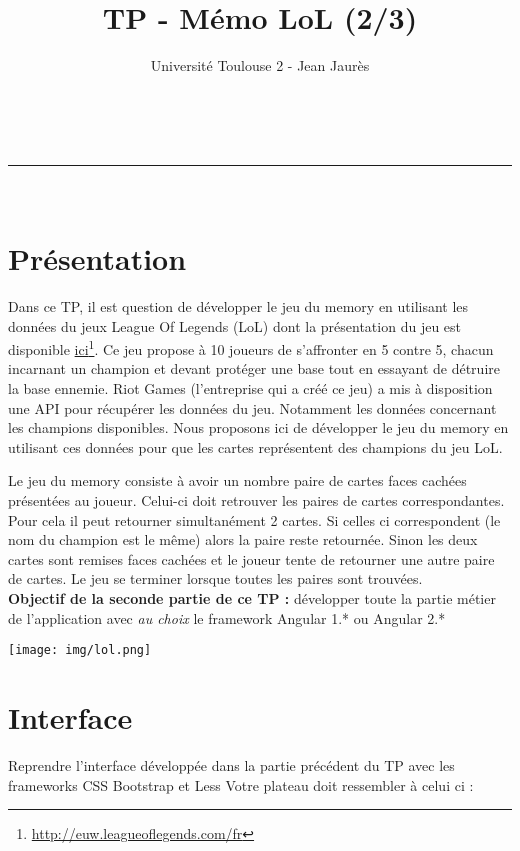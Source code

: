 \documentclass[a4paper,11pt]{article}
\makeatletter
\newcommand{\linia}{\rule{\linewidth}{0.5pt}}
\theoremstyle{mytheor}
\renewcommand{\maketitle}{
\begin{center}
\vspace{2ex}
{\huge \textsc{\@title}}
\vspace{1ex}
\\
\linia\\
\@author \hfill \@date
\vspace{4ex}
\end{center}
}
\makeatother
\begin{document}
\title{TP - Mémo LoL (2/3)}

\author{Université Toulouse 2 - Jean Jaurès}


\maketitle

\section*{Présentation}

Dans ce TP, il est question de développer le jeu du memory en utilisant les données du jeux League Of Legends (LoL) dont la présentation du jeu est disponible \href{http://euw.leagueoflegends.com/fr}{ici}\footnote{\url{http://euw.leagueoflegends.com/fr}}. Ce jeu propose à 10 joueurs de s'affronter en 5 contre 5, chacun incarnant un champion et devant protéger une base tout en essayant de détruire la base ennemie. Riot Games\textsuperscript{\texttrademark} (l'entreprise qui a créé ce jeu) a mis à disposition une API pour récupérer les données du jeu. Notamment les données concernant les champions disponibles. Nous proposons ici de développer le jeu du memory en utilisant ces données pour que les cartes représentent des champions du jeu LoL. 

Le jeu du memory consiste à avoir un nombre paire de cartes faces cachées présentées au joueur. Celui-ci doit retrouver les paires de cartes correspondantes. Pour cela il peut retourner simultanément 2 cartes. Si celles ci correspondent (le nom du champion est le même) alors la paire reste retournée. Sinon les deux cartes sont remises faces cachées et le joueur tente de retourner une autre paire de cartes. Le jeu se terminer lorsque toutes les paires sont trouvées. \\

\textbf{Objectif de la seconde partie de ce TP : }
développer toute la partie métier de l'application avec \textit{au choix} le framework Angular 1.* ou Angular 2.* 

\begin{center}
\texttt{[image: img/lol.png]} \\
\end{center}



\newpage

\section{Interface}
Reprendre l'interface développée dans la partie précédent du TP avec les frameworks CSS Bootstrap et Less
Votre plateau doit ressembler à celui ci : \\
\end{document}

